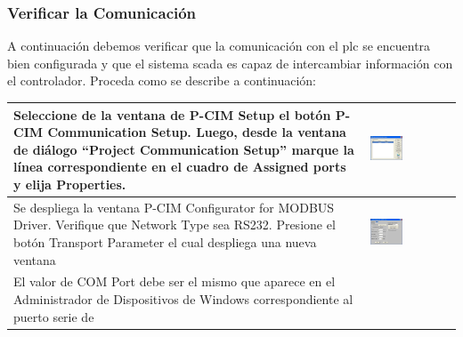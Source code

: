 \subsubsection{Verificar la Comunicación}
A continuación debemos verificar que la comunicación con el \gls{plc} 
se encuentra bien configurada y que el sistema \gls{scada} es capaz de
intercambiar información con el controlador.
Proceda como se describe a continuación:
\begin{table}[!ht]
\centering
\renewcommand*{\arraystretch}{0.01}
\begin{tabular}{*{2}{m{}}}
\hline
  Seleccione de la  ventana de P-CIM Setup  el botón P-CIM Communication Setup. 
  Luego, desde la ventana de diálogo ``Project Communication Setup'' 
  marque la línea correspondiente en el cuadro de Assigned ports y 
  elija  Properties.
    &\begin{center}
       \includegraphics[width=0.4\textwidth]
	{Cap5-SCADA/images/commSetup.jpeg}
    \end{center}\\
\hline
   Se despliega la ventana P-CIM Configurator for MODBUS Driver. Verifique 
   que Network Type sea RS232. Presione el botón Transport Parameter el cual 
   despliega una nueva ventana
  &\begin{center}
    \includegraphics[width=0.4\textwidth]
      {Cap5-SCADA/images/modbusDriver.jpeg}
  \end{center}\\
\hline 
   El valor de COM Port debe ser el mismo que aparece en el Administrador de 
   Dispositivos de Windows correspondiente al puerto serie de 

\end{tabular}
\end{table}
